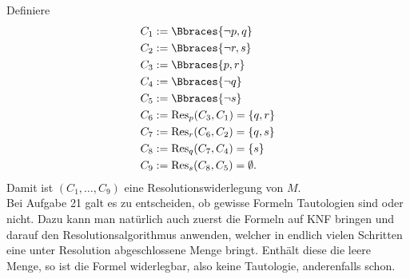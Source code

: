 \begin{solution}

Definiere
\begin{align*}
    C_1 &:= \Bbraces{\neg p, q} \\
    C_2 &:= \Bbraces{\neg r, s} \\
    C_3 &:= \Bbraces{p, r} \\
    C_4 &:= \Bbraces{\neg q} \\
    C_5 &:= \Bbraces{\neg s} \\
    C_6 &:= \mathrm{Res}_p(C_3,C_1) = \{q, r\} \\
    C_7 &:= \mathrm{Res}_r(C_6,C_2) = \{q, s\} \\
    C_8 &:= \mathrm{Res}_q(C_7,C_4) = \{s\} \\
    C_9 &:= \mathrm{Res}_s(C_8,C_5) = \emptyset.
\end{align*}
Damit ist $(C_1,\dots,C_9)$ eine Resolutionswiderlegung von $M$. \\
Bei Aufgabe 21 galt es zu entscheiden, ob gewisse Formeln Tautologien sind oder nicht.
Dazu kann man natürlich auch zuerst die Formeln auf KNF bringen und darauf den
Resolutionsalgorithmus anwenden, welcher in endlich vielen Schritten eine
unter Resolution abgeschlossene Menge bringt. Enthält diese die leere Menge,
so ist die Formel widerlegbar, also keine Tautologie, anderenfalls schon.

\end{solution}

